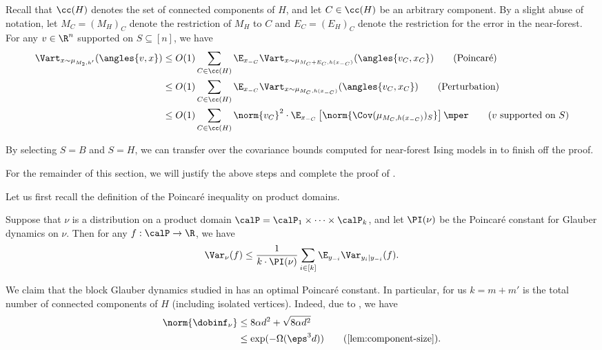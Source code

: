 \documentclass[11pt,letterpaper]{article}
\begin{document}
Recall that $\cc(H)$ denotes the set of connected components of $H$, and let $C \in \cc(H)$ be an arbitrary component.
By a slight abuse of notation, let $M_C = (M_H)_{C}$ denote the restriction of $M_H$ to $C$ and $E_C = (E_H)_{C}$ denote the restriction for the error in the near-forest. 
For any $v \in \R^n$ supported on $S \subseteq [n]$, we have
\begin{align*}
    \Vart_{x \sim \mu_{M_2, h'}}(\angles{v, x}) &\le O(1) \sum_{C \in \cc(H)} \E_{x_{-C}} \Vart_{x \sim \mu_{M_C + E_C, h(x_{-C})}}(\angles{v_C, x_C}) \tag*{(\text{Poincar\'{e}})}\\
    &\le O(1) \sum_{C \in \cc(H)} \E_{x_{-C}} \Vart_{x \sim \mu_{M_C, h(x_{-C})}}(\angles{v_C, x_C}) \tag*{(\text{Perturbation})} \\
    &\le O(1) \sum_{C \in \cc(H)} \norm{v_C}^2 \cdot \E_{x_{-C}} \left[\norm{\Cov(\mu_{M_C, h(x_{-C})})_{S}}\right] \mper \tag*{(\text{$v$ supported on $S$})}
\end{align*}

By selecting $S = B$ and $S = H$, we can transfer over the covariance bounds computed for near-forest Ising models in  to finish off the proof. 

For the remainder of this section, we will justify the above steps and complete the proof of .

Let us first recall the definition of the Poincar\'{e} inequality on product domains.
\begin{definition}
    \label{lem:poincare}
    Suppose that $\nu$ is a distribution on a product domain $\calP = \calP_1 \times \cdots \times \calP_k$, and let $\PI(\nu)$ be the Poincar\'{e} constant for Glauber dynamics on $\nu$. 
    Then for any $f : \calP \to \R$, we have
    \[
        \Var_\nu(f) \le \frac{1}{k \cdot \PI(\nu)} \sum_{i \in [k]} \E_{y_{-i}} \Var_{y_i | y_{-i}}(f).
    \]
\end{definition}
We claim that the block Glauber dynamics studied in  has an optimal Poincar\'{e} constant. 
In particular, for us $k = m + m'$ is the total number of connected components of $H$ (including isolated vertices).
Indeed, due to , we have  
\begin{align*}
    \norm{\dobinf_{\nu}} &\le 8\alpha d^2 + \sqrt{8\alpha d^2} \\
    &\le \exp(-\Omega(\eps^3 d)) \tag*{(\Cref{lem:component-size})}.
\end{align*}
\end{document}
